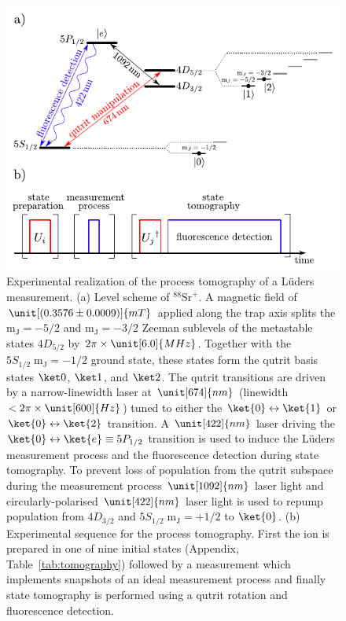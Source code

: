 \documentclass[
aps,prl,
reprint,
a4paper,
superscriptaddress,
floatfix,
]{revtex4-1}
\begin{document}
\begin{figure}[htp]
\includegraphics[width=\linewidth]{fig1.pdf}
\caption{\label{fig:experiment}
Experimental realization of the process tomography of a Lüders measurement.
(a)
Level scheme of $^{88}\mathrm{Sr}^{+}$.
A magnetic field of $\unit[(0.3576\pm 0.0009)]{mT}$ applied along the trap 
 axis splits the $\mathrm{m_J}= -5/2$ and $\mathrm{m_J}= -3/2$ Zeeman
 sublevels of the metastable states $4D_{5/2}$ by $2\pi\times \unit[6.0]{MHz}$.
Together with the $5S_{1/2}\;\mathrm{m_J}= -1/2$ ground state, these states 
 form the qutrit basis states $\ket0$, $\ket1$, and $\ket2$.
The qutrit transitions are driven by a narrow-linewidth laser at $\unit[674]{nm}$
 (linewidth $<2\pi\times \unit[600]{Hz}$) tuned to either the
 $\ket{0} \leftrightarrow \ket{1}$ or $\ket{0} \leftrightarrow \ket{2}$ transition.
A $\unit[422]{nm}$ laser driving the $\ket{0} \leftrightarrow \ket{e} \equiv 5P_{1/2}$ 
 transition is used to induce the Lüders measurement process and the fluorescence
 detection during state tomography.
To prevent loss of population from the qutrit subspace during the measurement process $\unit[1092]{nm}$ laser light and circularly-polarised $\unit[422]{nm}$ laser light is used to repump population from $4D_{3/2}$ and $5S_{1/2}\;\mathrm{m_J}= +1/2$ to $\ket{0}$.
(b)
Experimental sequence for the process tomography.
First the ion is prepared in one of nine initial states (Appendix, Table~\ref{tab:tomography}) followed 
 by a measurement which implements snapshots of an ideal 
 measurement process and finally state tomography is performed using a qutrit rotation and fluorescence detection.}
\end{figure}
\end{document}
